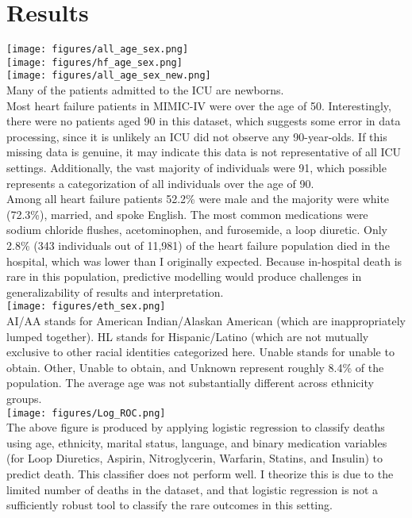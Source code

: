 \documentclass{article}
\begin{document}
\section{Results}
\texttt{[image: figures/all\_age\_sex.png]}\\
\texttt{[image: figures/hf\_age\_sex.png]}\\
\texttt{[image: figures/all\_age\_sex\_new.png]}\\
Many of the patients admitted to the ICU are newborns.\\
Most heart failure patients in MIMIC-IV were over the age of 50. Interestingly, there were no patients aged 90 in this dataset, which suggests some error in data processing, since it is unlikely an ICU did not observe any 90-year-olds. If this missing data is genuine, it may indicate this data is not representative of all ICU settings. Additionally, the vast majority of individuals were 91, which possible represents a categorization of all individuals over the age of 90.\\
Among all heart failure patients 52.2\% were male and the majority were white (72.3\%), married, and spoke English. The most common medications were sodium chloride flushes, acetominophen, and furosemide, a loop diuretic. Only 2.8\% (343 individuals out of 11,981) of the heart failure population died in the hospital, which was lower than I originally expected. Because in-hospital death is rare in this population, predictive modelling would produce challenges in generalizability of results and interpretation.\\
\texttt{[image: figures/eth\_sex.png]}\\
AI/AA stands for American Indian/Alaskan American (which are inappropriately lumped together). HL stands for Hispanic/Latino (which are not mutually exclusive to other racial identities categorized here. Unable stands for unable to obtain. Other, Unable to obtain, and Unknown represent roughly 8.4\% of the population. The average age was not substantially different across ethnicity groups.\\
\texttt{[image: figures/Log\_ROC.png]}\\
The above figure is produced by applying logistic regression to classify deaths using age, ethnicity, marital status, language, and binary medication variables (for Loop Diuretics, Aspirin, Nitroglycerin, Warfarin, Statins, and Insulin) to predict death. This classifier does not perform well. I theorize this is due to the limited number of deaths in the dataset, and that logistic regression is not a sufficiently robust tool to classify the rare outcomes in this setting.\\
\end{document}

